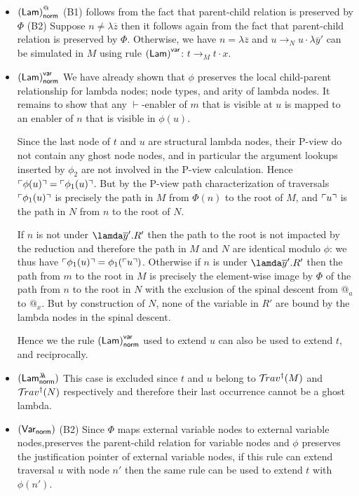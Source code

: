 \documentclass{article}
\theoremstyle{plain}
\theoremstyle{definition}
\theoremstyle{remark}
\newcommand{\ghostlmd}{{\lambda\!\!\lambda}}
\newcommand{\normalizing}{{\sf norm}}
\newcommand{\enables}{\vdash} %
\begin{document}
\begin{description}[itemindent=0em,leftmargin=0cm]
\begin{itemize}[itemindent=0.5em, leftmargin=0.5em]
    \item $\rulename{Lam}^@_\normalizing$
    (B1) follows from the fact that parent-child relation is preserved by $\Phi$
    (B2) Suppose $n \neq \lambda\overline{z}$ then it follows again from the fact that parent-child relation is preserved by $\Phi$.
    Otherwise, we have $n = \lambda\overline{z}$ and $u \rightarrow_N u \cdot \lambda\overline{y}'$ can be simulated in $M$ using rule $\mathbf{({\sf Lam})}^{\sf var}$: $t \rightarrow_M t \cdot x$.

    \item $\rulename{Lam}^{\sf var}_\normalizing$
    We have already shown that  $\phi$ preserves the local child-parent relationship for lambda nodes; node types, and arity of lambda nodes.
    It remains to show that any $\enables$-enabler of $m$ that is visible at  $u$ is mapped to an enabler of $n$ that is visible in $\phi(u)$.

    Since the last node of $t$ and $u$ are structural lambda nodes, their P-view do not contain any ghost node nodes, and in particular the argument lookups inserted by $\phi_2$ are not involved in the P-view calculation. Hence $\ulcorner \phi(u) \urcorner = \ulcorner \phi_1(u) \urcorner$.
    But by the P-view path characterization of traversals $\ulcorner \phi_1(u) \urcorner$ is precisely the path in $M$ from $\Phi(n)$ to the root of $M$,
    and $\ulcorner u \urcorner$ is the path in $N$ from $n$ to the root of $N$.

    If $n$ is not under $\lamda\overline{y}'.R'$ then the path to the root is not impacted by the reduction and therefore the path in $M$ and $N$ are identical modulo $\phi$: we thus have $\ulcorner \phi_1(u) \urcorner = \phi_1(\ulcorner u \urcorner)$.
    Otherwise if $n$ is under $\lamda\overline{y}'.R'$ then the path from $m$ to the root in $M$ is precisely the element-wise image by $\Phi$ of the path from $n$ to the root in $N$ with the exclusion of the spinal descent from $@_a$ to $@_x$. But by construction of $N$, none of the variable in $R'$ are bound by the lambda nodes in the spinal descent.

    Hence we the rule $\rulename{Lam}^{\sf var}_\normalizing$ used to extend  $u$ can also be used to extend $t$, and reciprocally.

    \item $\rulename{Lam^\ghostlmd_\normalizing}$
    This case is excluded since $t$ and $u$ belong to $\mathcal{T}\!rav^\dagger(M)$ and
    $\mathcal{T}\!rav^\dagger(N)$ respectively and therefore their last occurrence cannot be a ghost lambda.

    \item $\rulename{Var_\normalizing}$
    (B2) Since $\Phi$ maps external variable nodes to external variable nodes,preserves the parent-child relation for variable nodes and $\phi$ preserves the justification pointer of external variable nodes, if this rule can extend traversal $u$ with node $n'$ then the same rule can be used to extend $t$ with $\phi(n')$.


\end{itemize}
\end{description}
\end{document}
